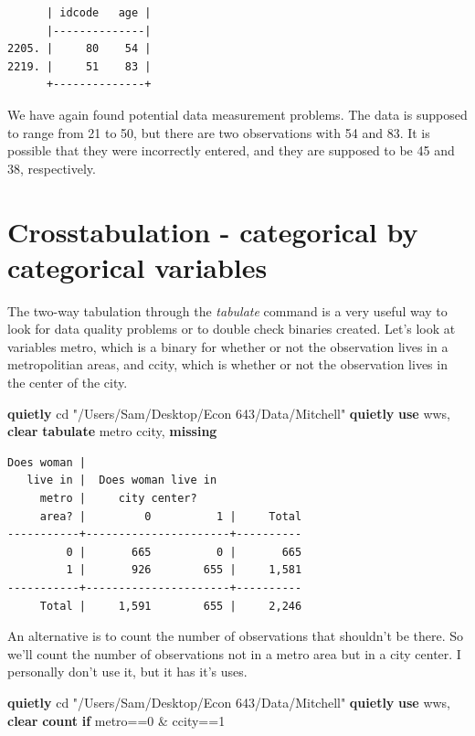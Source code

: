 \documentclass[
]{book}
\newenvironment{Shaded}{\begin{snugshade}}{\end{snugshade}}
\newcommand{\FunctionTok}[1]{\textcolor[rgb]{0.13,0.29,0.53}{\textbf{#1}}}
\newcommand{\KeywordTok}[1]{\textcolor[rgb]{0.13,0.29,0.53}{\textbf{#1}}}
\newcommand{\NormalTok}[1]{#1}
\newcommand{\StringTok}[1]{\textcolor[rgb]{0.31,0.60,0.02}{#1}}
\begin{document}
\begin{verbatim}
      | idcode   age |
      |--------------|
2205. |     80    54 |
2219. |     51    83 |
      +--------------+
\end{verbatim}

We have again found potential data measurement problems. The data is supposed to range from 21 to 50, but there are two observations with 54 and 83. It is possible that they were incorrectly entered, and they are supposed to be 45 and 38, respectively.

\section{Crosstabulation - categorical by categorical variables}\label{crosstabulation---categorical-by-categorical-variables}

The two-way tabulation through the \emph{tabulate} command is a very useful way to look for data quality problems or to double check binaries created. Let's look at variables metro, which is a binary for whether or not the observation lives in a metropolitian areas, and ccity, which is whether or not the observation lives in the center of the city.

\begin{Shaded}
\begin{Highlighting}[]
\KeywordTok{quietly}\NormalTok{ cd }\StringTok{"/Users/Sam/Desktop/Econ 643/Data/Mitchell"}
\KeywordTok{quietly} \KeywordTok{use}\NormalTok{ wws, }\KeywordTok{clear}
\KeywordTok{tabulate}\NormalTok{ metro ccity, }\FunctionTok{missing}
\end{Highlighting}
\end{Shaded}

\begin{verbatim}
Does woman |
   live in |  Does woman live in
     metro |     city center?
     area? |         0          1 |     Total
-----------+----------------------+----------
         0 |       665          0 |       665 
         1 |       926        655 |     1,581 
-----------+----------------------+----------
     Total |     1,591        655 |     2,246 
\end{verbatim}

An alternative is to count the number of observations that shouldn't be there. So we'll count the number of observations not in a metro area but in a city center. I personally don't use it, but it has it's uses.

\begin{Shaded}
\begin{Highlighting}[]
\KeywordTok{quietly}\NormalTok{ cd }\StringTok{"/Users/Sam/Desktop/Econ 643/Data/Mitchell"}
\KeywordTok{quietly} \KeywordTok{use}\NormalTok{ wws, }\KeywordTok{clear}
\FunctionTok{count} \KeywordTok{if}\NormalTok{ metro==0 \& ccity==1}
\end{Highlighting}
\end{Shaded}
\end{document}

